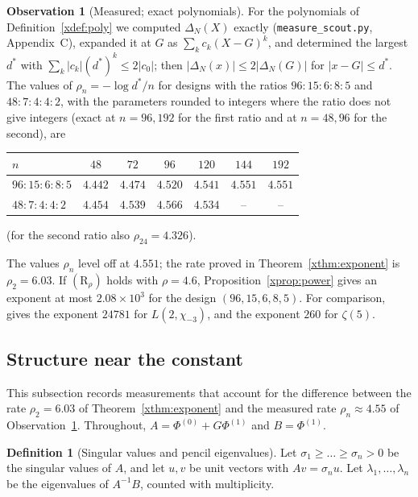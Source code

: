 \documentclass[11pt]{article}
\theoremstyle{definition}
\newtheorem{definition}[theorem]{Definition}
\newtheorem{observation}[theorem]{Observation}
\begin{document}
\begin{observation}[Measured; exact polynomials]\label{xobs:radius}
For the polynomials of Definition~\ref{xdef:poly} we computed $\Delta_N(X)$ exactly (\texttt{measure\_scout.py}, Appendix~C), expanded it at $G$ as $\sum_kc_k(X-G)^k$, and determined the largest $d^*$ with $\sum_k|c_k|(d^*)^k\le2|c_0|$; then $|\Delta_N(x)|\le2|\Delta_N(G)|$ for $|x-G|\le d^*$. The values of $\rho_n=-\log d^*/n$ for designs with the ratios $96:15:6:8:5$ and $48:7:4:4:2$, with the parameters rounded to integers where the ratio does not give integers (exact at $n=96,192$ for the first ratio and at $n=48,96$ for the second), are
\begin{center}
\begin{tabular}{lcccccc}
\toprule
$n$ & $48$ & $72$ & $96$ & $120$ & $144$ & $192$\\
\midrule
$96:15:6:8:5$ & $4.442$ & $4.474$ & $4.520$ & $4.541$ & $4.551$ & $4.551$\\
$48:7:4:4:2$ & $4.454$ & $4.539$ & $4.566$ & $4.534$ & -- & --\\
\bottomrule
\end{tabular}
\end{center}
(for the second ratio also $\rho_{24}=4.326$).
\end{observation}

The values $\rho_n$ level off at $4.551$; the rate proved in Theorem~\ref{xthm:exponent} is $\rho_2=6.03$. If $(\mathrm R_\rho)$ holds with $\rho=4.6$, Proposition~\ref{xprop:power} gives an exponent at most $2.08\times10^3$ for the design $(96,15,6,8,5)$. For comparison, \cite[Theorem~5.1]{CDT} gives the exponent $24781$ for $L(2,\chi_{-3})$, and \cite[Corollary~1.2]{Fauzan} the exponent $260$ for $\zeta(5)$.

\subsection{Structure near the constant}\label{xsec:structure}

This subsection records measurements that account for the difference between the rate $\rho_2=6.03$ of Theorem~\ref{xthm:exponent} and the measured rate $\rho_n\approx4.55$ of Observation~\ref{xobs:radius}. Throughout, $A=\Phi^{(0)}+G\Phi^{(1)}$ and $B=\Phi^{(1)}$.

\begin{definition}[Singular values and pencil eigenvalues]\label{xdef:pencil}
Let $\sigma_1\ge\dots\ge\sigma_n>0$ be the singular values of $A$, and let $u,v$ be unit vectors with $Av=\sigma_nu$. Let $\lambda_1,\dots,\lambda_n$ be the eigenvalues of $A^{-1}B$, counted with multiplicity.
\end{definition}
\end{document}
